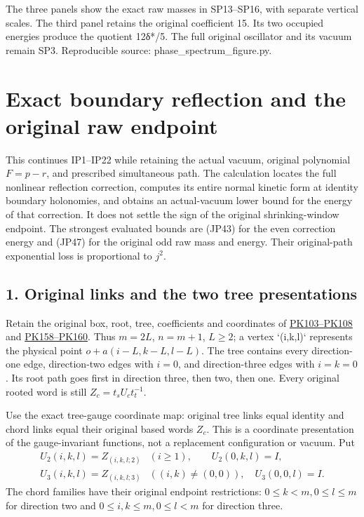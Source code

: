 \documentclass[11pt]{article}
\begin{document}
The three panels show the exact raw masses in SP13–SP16, with separate vertical scales. The third panel retains the original coefficient 15. Its two occupied energies produce the quotient 12δ*/5. The full original oscillator and its vacuum remain SP3. Reproducible source: phase\_spectrum\_figure.py.
\clearpage
\section*{Exact boundary reflection and the original raw endpoint}

This continues IP1–IP22 while retaining the actual vacuum, original
polynomial \(F=p-r\), and prescribed simultaneous path. The calculation
locates the full nonlinear reflection correction, computes its entire
normal kinetic form at identity boundary holonomies, and obtains an
actual-vacuum lower bound for the energy of that correction. It does not
settle the sign of the original shrinking-window endpoint.
The strongest evaluated bounds are (JP43) for the even correction
energy and (JP47) for the original odd raw mass and energy. Their
original-path exponential loss is proportional to \(j^2\).

\subsection*{1. Original links and the two tree presentations}

Retain the original box, root, tree, coefficients and coordinates of
\href{https://github.com/KokunoYumeto/yang-mills-interacting-workbench/blob/485b61423c1f4e1805deb453c1b6b342b27842b6/yang-mills/continuations/20260930-s6-ns-moment-map-bridge/PERIOD_COUPLING_AND_PHYSICAL_KERNELS.md#L2440}{PK103–PK108}
and \href{https://github.com/KokunoYumeto/yang-mills-interacting-workbench/blob/485b61423c1f4e1805deb453c1b6b342b27842b6/yang-mills/continuations/20260930-s6-ns-moment-map-bridge/PERIOD_COUPLING_AND_PHYSICAL_KERNELS.md#L3500}{PK158–PK160}.
Thus \(m=2L\), \(n=m+1\), \(L\ge2\); a vertex `(i,k,l)` represents
the physical point \(o+a(i-L,k-L,l-L)\). The tree contains every
direction-one edge, direction-two edges with \(i=0\), and direction-three
edges with \(i=k=0\). Its root path goes first in direction three, then
two, then one. Every original rooted word is still
\(Z_c=t_sU_ct_t^{-1}\).

Use the exact tree-gauge coordinate map: original tree links equal
identity and chord links equal their original based words \(Z_c\).
This is a coordinate presentation of the gauge-invariant functions,
not a replacement configuration or vacuum. Put
\[
\begin{array}{ll}
 U_2(i,k,l)=Z_{(i,k,l;2)}&(i\ge1),\qquad U_2(0,k,l)=I,\\
 U_3(i,k,l)=Z_{(i,k,l;3)}&((i,k)\ne(0,0)),\quad U_3(0,0,l)=I.
\end{array}\tag{JP1}
\]
The chord families have their original endpoint restrictions:
\(0\le k<m,0\le l\le m\) for direction two and
\(0\le i,k\le m,0\le l<m\) for direction three.
\end{document}
